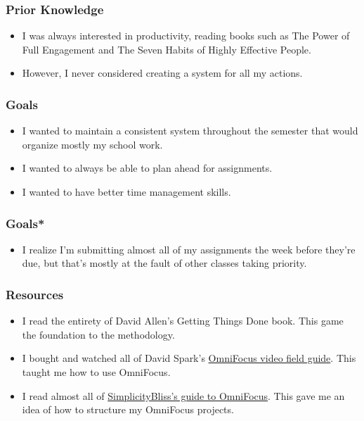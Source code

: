 \documentclass[xclolor=dvipsnames]{beamer}            %
\begin{document}
\begin{darkframes}
\begin{frame}
    \end{frame}


    \begin{frame}
        \frametitle{Prior Knowledge}

        \begin{itemize}
            \item I was always interested in productivity, reading books such as The Power of Full Engagement and The Seven Habits of Highly Effective People.
            \item However, I never considered creating a system for all my actions.
        \end{itemize}
    \end{frame}

    \begin{frame}
        \frametitle{Goals}

        \begin{itemize}
            \item I wanted to maintain a consistent system throughout the semester that would organize mostly my school work.
            \item I wanted to always be able to plan ahead for assignments.
            \item I wanted to have better time management skills.
        \end{itemize}
    \end{frame}

    \begin{frame}
        \frametitle{Goals*}

        \begin{itemize}
            \item I realize I'm submitting almost all of my assignments the week before they're due, but that's mostly at the fault of other classes taking priority.
        \end{itemize}
    \end{frame}

    \begin{frame}
        \frametitle{Resources}

        \begin{itemize}
            \item I read the entirety of David Allen's Getting Things Done book. This game the foundation to the methodology.
            \item I bought and watched all of David Spark's \href{https://www.macsparky.com/omnifocus/}{OmniFocus video field guide}. This taught me how to use OmniFocus.
            \item I read almost all of \href{https://simplicitybliss.com/essential-omnifocus-posts-cb5d7fd4bbd6}{SimplicityBliss's guide to OmniFocus}. This gave me an idea of how to structure my OmniFocus projects.
        \end{itemize}
    \end{frame}


\end{darkframes}
\end{document}
